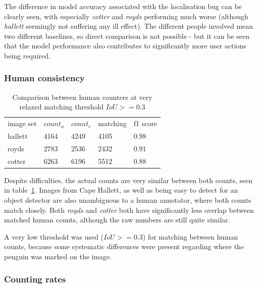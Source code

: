 The difference in model accuracy associated with the localisation bug can be clearly seen, with especially \emph{cotter} and \emph{royds} performing much worse (although \emph{hallett} seemingly not suffering any ill effect). The different people involved mean two different baselines, so direct comparison is not possible - but it can be seen that the model performance also contributes to significantly more user actions being required.


\subsubsection{Human consistency}

\begin{table}[h!]
\begin{tabular}{lllll}
image set & $count_a$ & $count_c$ & matching & f1 score \\
hallett   & 4164      & 4249      & 4105     & 0.98     \\
royds     & 2783      & 2536      & 2432     & 0.91     \\
cotter    & 6263      & 6196      & 5512     & 0.88    
\end{tabular}
\caption{Comparison between human counters at very relaxed matching threshold $IoU >= 0.3$}
\label{tab:human_comparison} 
\end{table}
 
Despite difficulties, the actual counts are very similar between both counts, seen in table~\ref{tab:human_comparison}. Images from Cape Hallett, as well as being easy to detect for an object detector are also unambiguous to a human annotator, where both counts match closely. Both \emph{royds} and \emph{cotter} both have significantly less overlap between matched human counts, although the raw numbers are still quite similar.

A very low threshold was used ($IoU >= 0.3$) for matching between human counts, because some systematic differences were present regarding where the penguin was marked on the image.


\subsubsection {Counting rates}

